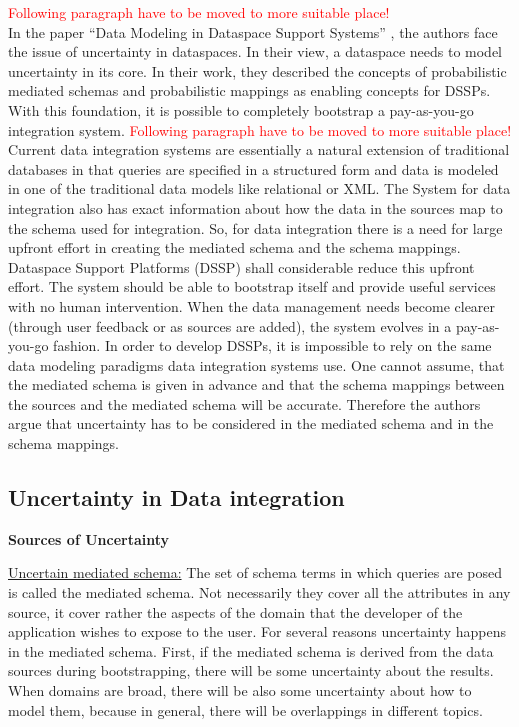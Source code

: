 \textcolor{red}{Following paragraph have to be moved to more suitable place!}\\
In the paper ``Data Modeling in Dataspace Support Systems'' \cite{DBLP:conf/birthday/SarmaDH09}, the authors face the issue of uncertainty in dataspaces. In their view, a dataspace needs to model uncertainty in its core. In their work, they described the concepts of probabilistic mediated schemas and probabilistic mappings as enabling concepts for DSSPs. With this foundation, it is possible to completely bootstrap a pay-as-you-go integration system.
\textcolor{red}{Following paragraph have to be moved to more suitable place!}\\
Current data integration systems are essentially a natural extension of traditional databases in that queries are specified in a structured form and data is modeled in one of the traditional data models like relational or XML. The System for data integration also has exact information about how the data in the sources map to the schema used for integration. So, for data integration there is a need for large upfront effort in creating the mediated schema and the schema mappings. Dataspace Support Platforms (DSSP) shall considerable reduce this upfront effort. The system should be able to bootstrap itself and provide useful services with no human intervention. When the data management needs become clearer (through user feedback or as sources are added), the system evolves in a pay-as-you-go fashion. 
In order to develop DSSPs, it is impossible to rely on the same data modeling paradigms data integration systems use. One cannot assume, that the mediated schema is given in advance and that the schema mappings between the sources and the mediated schema will be accurate. Therefore the authors argue that uncertainty has to be considered in the mediated schema and in the schema mappings.

\subsection{Uncertainty in Data integration}

\textbf{Sources of Uncertainty}

\uline{Uncertain mediated schema:} The set of schema terms in which queries are posed is called the mediated schema. Not necessarily they cover all the attributes in any source, it cover rather the aspects of the domain that the developer of the application wishes to expose to the user. For several reasons uncertainty happens in the mediated schema. First, if the mediated schema is derived from the data sources during bootstrapping, there will be some uncertainty about the results. When domains are broad, there will be also some uncertainty about how to model them, because in general, there will be overlappings in different topics. 

